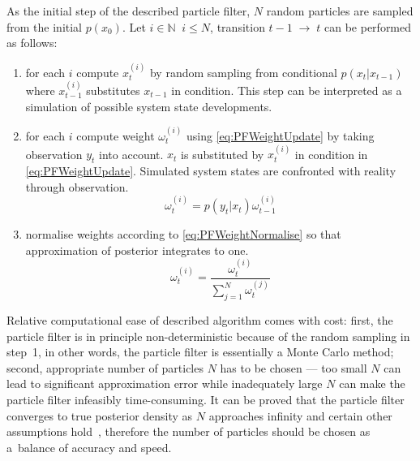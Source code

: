As the initial step of the described particle filter, \(N\) random particles are sampled
from the initial {\pdf}
\(p(x_0)\). Let \(i \in \mathbb{N} \;\; i \leq N\), transition \(t-1 \; \rightarrow \; t\) can be
performed as follows:
\begin{enumerate}
	\item for each \(i\) compute \(x_t^{(i)}\) by random sampling from conditional {\pdf}
		\(p(x_t|x_{t-1})\) where \(x_{t-1}^{(i)}\) substitutes \(x_{t-1}\) in condition. This step
		can be interpreted as a simulation of possible system state developments.
	\item for each \(i\) compute weight \(\omega_t^{(i)}\) using \eqref{eq:PFWeightUpdate}
		by taking observation \(y_t\) into account. \(x_t\) is substituted by \(x_t^{(i)}\) in
		condition in \eqref{eq:PFWeightUpdate}. Simulated system states are confronted with reality
		through observation.
		\begin{equation} \label{eq:PFWeightUpdate}
			\omega_t^{(i)} = p(y_t | x_t) \omega_{t-1}^{(i)}
		\end{equation}
	\item normalise weights according to \eqref{eq:PFWeightNormalise} so that approximation of
		posterior {\pdf} integrates to one.
		\begin{equation} \label{eq:PFWeightNormalise}
			\omega_t^{(i)} = \frac{\omega_t^{(i)}}{\sum_{j=1}^N \omega_t^{(j)}}
		\end{equation}
\end{enumerate}

Relative computational ease of described algorithm comes with
cost: first, the particle filter is in principle non-deterministic because of the random sampling in
step~1, in other words, the particle filter is essentially a Monte Carlo method; second, appropriate
number of particles \(N\) has to be chosen --- too small \(N\) can lead to significant approximation
error while inadequately large \(N\) can make the particle filter infeasibly time-consuming. It can be
proved that the particle filter converges to true posterior density as \(N\) approaches
infinity and certain other assumptions hold~\cite{CriDou:02}, therefore the number of particles
should be chosen as a~balance of accuracy and speed.

